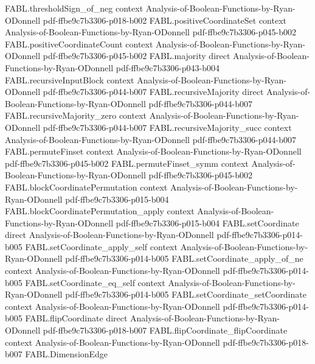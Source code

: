 \begin{theorem}
\proofstep
  {FABL.thresholdSign_of_neg}
  {context}
  {Analysis-of-Boolean-Functions-by-Ryan-ODonnell}
  {pdf-ffbe9c7b3306-p018-b002}
\proofstep
  {FABL.positiveCoordinateSet}
  {context}
  {Analysis-of-Boolean-Functions-by-Ryan-ODonnell}
  {pdf-ffbe9c7b3306-p045-b002}
\proofstep
  {FABL.positiveCoordinateCount}
  {context}
  {Analysis-of-Boolean-Functions-by-Ryan-ODonnell}
  {pdf-ffbe9c7b3306-p045-b002}
\proofstep
  {FABL.majority}
  {direct}
  {Analysis-of-Boolean-Functions-by-Ryan-ODonnell}
  {pdf-ffbe9c7b3306-p043-b004}
\proofstep
  {FABL.recursiveInputBlock}
  {context}
  {Analysis-of-Boolean-Functions-by-Ryan-ODonnell}
  {pdf-ffbe9c7b3306-p044-b007}
\proofstep
  {FABL.recursiveMajority}
  {direct}
  {Analysis-of-Boolean-Functions-by-Ryan-ODonnell}
  {pdf-ffbe9c7b3306-p044-b007}
\proofstep
  {FABL.recursiveMajority_zero}
  {context}
  {Analysis-of-Boolean-Functions-by-Ryan-ODonnell}
  {pdf-ffbe9c7b3306-p044-b007}
\proofstep
  {FABL.recursiveMajority_succ}
  {context}
  {Analysis-of-Boolean-Functions-by-Ryan-ODonnell}
  {pdf-ffbe9c7b3306-p044-b007}
\proofstep
  {FABL.permuteFinset}
  {context}
  {Analysis-of-Boolean-Functions-by-Ryan-ODonnell}
  {pdf-ffbe9c7b3306-p045-b002}
\proofstep
  {FABL.permuteFinset_symm}
  {context}
  {Analysis-of-Boolean-Functions-by-Ryan-ODonnell}
  {pdf-ffbe9c7b3306-p045-b002}
\proofstep
  {FABL.blockCoordinatePermutation}
  {context}
  {Analysis-of-Boolean-Functions-by-Ryan-ODonnell}
  {pdf-ffbe9c7b3306-p015-b004}
\proofstep
  {FABL.blockCoordinatePermutation_apply}
  {context}
  {Analysis-of-Boolean-Functions-by-Ryan-ODonnell}
  {pdf-ffbe9c7b3306-p015-b004}
\proofstep
  {FABL.setCoordinate}
  {direct}
  {Analysis-of-Boolean-Functions-by-Ryan-ODonnell}
  {pdf-ffbe9c7b3306-p014-b005}
\proofstep
  {FABL.setCoordinate_apply_self}
  {context}
  {Analysis-of-Boolean-Functions-by-Ryan-ODonnell}
  {pdf-ffbe9c7b3306-p014-b005}
\proofstep
  {FABL.setCoordinate_apply_of_ne}
  {context}
  {Analysis-of-Boolean-Functions-by-Ryan-ODonnell}
  {pdf-ffbe9c7b3306-p014-b005}
\proofstep
  {FABL.setCoordinate_eq_self}
  {context}
  {Analysis-of-Boolean-Functions-by-Ryan-ODonnell}
  {pdf-ffbe9c7b3306-p014-b005}
\proofstep
  {FABL.setCoordinate_setCoordinate}
  {context}
  {Analysis-of-Boolean-Functions-by-Ryan-ODonnell}
  {pdf-ffbe9c7b3306-p014-b005}
\proofstep
  {FABL.flipCoordinate}
  {direct}
  {Analysis-of-Boolean-Functions-by-Ryan-ODonnell}
  {pdf-ffbe9c7b3306-p018-b007}
\proofstep
  {FABL.flipCoordinate_flipCoordinate}
  {context}
  {Analysis-of-Boolean-Functions-by-Ryan-ODonnell}
  {pdf-ffbe9c7b3306-p018-b007}
\proofstep
  {FABL.DimensionEdge}

\end{theorem}
